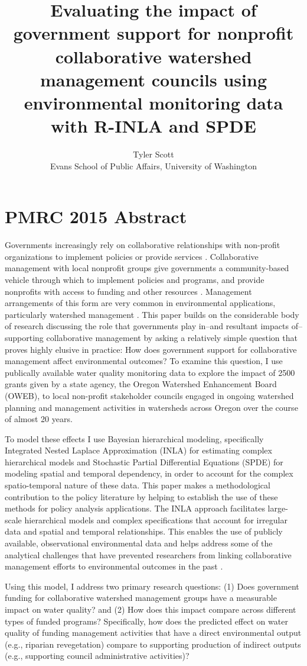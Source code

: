 \documentclass[11pt,a4paper,titlepage]{article}
\title{Evaluating the impact of government support for nonprofit collaborative watershed management councils using environmental monitoring data with R-INLA and SPDE}
\author{Tyler Scott\\ Evans School of Public Affairs, University of Washington}
\begin{document}
\section*{PMRC 2015 Abstract}

Governments increasingly rely on collaborative relationships with non-profit organizations to implement policies or provide services \parencite{salamon2002}. Collaborative management with local nonprofit groups give governments a community-based vehicle through which to implement policies and programs, and provide nonprofits with access to funding and other resources \parencite{nikolic2008}. Management arrangements of this form are very common in environmental applications, particularly watershed management \parencite[e.g.,][]{leach2013,leach2002,margerum2011}. This paper builds on the considerable body of research discussing the role that governments play in--and resultant impacts of--supporting collaborative management \parencite[e.g.,][]{nikolic2008,lubell2008,ansell2008,emerson2012} by asking a relatively simple question that proves highly elusive in practice: How does government support for collaborative management affect environmental outcomes? To examine this question, I use publically available water quality monitoring data to explore the impact of 2500 grants given by a state agency, the Oregon Watershed Enhancement Board (OWEB), to local non-profit stakeholder councils engaged in ongoing watershed planning and management activities in watersheds across Oregon over the course of almost 20 years.

To model these effects I use Bayesian hierarchical modeling, specifically Integrated Nested Laplace Approximation (INLA) \parencite{rue2009} for estimating complex hierarchical models and Stochastic Partial Differential Equations (SPDE) \parencite{lindgren2011} for modeling spatial and temporal dependency, in order to account for the complex spatio-temporal nature of these data. This paper makes a methodological contribution to the policy literature by helping to establish the use of these methods for policy analysis applications. The INLA approach facilitates large-scale hierarchical models and complex specifications that account for irregular data and spatial and temporal relationships. This enables the use of publicly available, observational environmental data and helps address some of the analytical challenges that have prevented researchers from linking collaborative management efforts to environmental outcomes in the past \parencite{koontz2006}.

Using this model, I address two primary research questions: (1) Does government funding for collaborative watershed management groups have a measurable impact on water quality? and (2) How does this impact compare across different types of funded programs? Specifically, how does the predicted effect on water quality of funding management activities that have a direct environmental output (e.g., riparian revegetation) compare to supporting production of indirect outputs (e.g., supporting council administrative activities)?

\printbibliography
\end{document}

